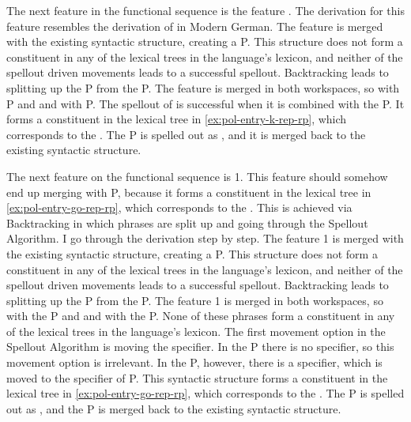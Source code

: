 The next feature in the functional sequence is the feature . The derivation for this feature resembles the derivation of  in Modern German.
The feature is merged with the existing syntactic structure, creating a P.
This structure does not form a constituent in any of the lexical trees in the language's lexicon, and neither of the spellout driven movements leads to a successful spellout.
Backtracking leads to splitting up the P from the P.
The feature  is merged in both workspaces, so with P and and with P. The spellout of  is successful when it is combined with the P.
It forms a constituent in the lexical tree in \ref{ex:pol-entry-k-rep-rp}, which corresponds to the .
The P is spelled out as , and it is merged back to the existing syntactic structure.

The next feature on the functional sequence is 1. This feature should somehow end up merging with P, because it forms a constituent in the lexical tree in \ref{ex:pol-entry-go-rep-rp}, which corresponds to the .
This is achieved via Backtracking in which phrases are split up and going through the Spellout Algorithm. I go through the derivation step by step.
The feature 1 is merged with the existing syntactic structure, creating a P.
This structure does not form a constituent in any of the lexical trees in the language's lexicon, and neither of the spellout driven movements leads to a successful spellout.
Backtracking leads to splitting up the P from the P.
The feature 1 is merged in both workspaces, so with the P and and with the P. None of these phrases form a constituent in any of the lexical trees in the language's lexicon.
The first movement option in the Spellout Algorithm is moving the specifier. In the P there is no specifier, so this movement option is irrelevant. In the P, however, there is a specifier, which is moved to the specifier of P.
This syntactic structure forms a constituent in the lexical tree in \ref{ex:pol-entry-go-rep-rp}, which corresponds to the .
The P is spelled out as , and the P is merged back to the existing syntactic structure.

